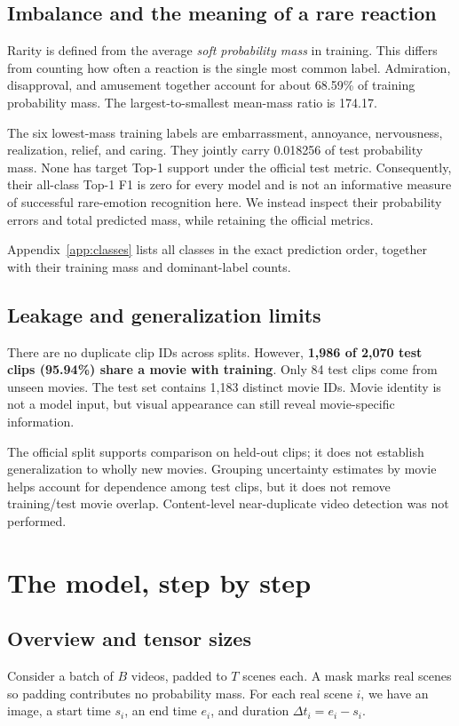 \documentclass[11pt,a4paper]{article}
\begin{document}
\subsection{Imbalance and the meaning of a rare reaction}
Rarity is defined from the average \emph{soft probability mass} in training. This differs from counting how often a reaction is the single most common label. Admiration, disapproval, and amusement together account for about 68.59\% of training probability mass. The largest-to-smallest mean-mass ratio is 174.17.

The six lowest-mass training labels are embarrassment, annoyance, nervousness, realization, relief, and caring. They jointly carry 0.018256 of test probability mass. None has target Top-1 support under the official test metric. Consequently, their all-class Top-1 F1 is zero for every model and is not an informative measure of successful rare-emotion recognition here. We instead inspect their probability errors and total predicted mass, while retaining the official metrics.

Appendix~\ref{app:classes} lists all classes in the exact prediction order, together with their training mass and dominant-label counts.

\subsection{Leakage and generalization limits}
There are no duplicate clip IDs across splits. However, \textbf{1,986 of 2,070 test clips (95.94\%) share a movie with training}. Only 84 test clips come from unseen movies. The test set contains 1,183 distinct movie IDs. Movie identity is not a model input, but visual appearance can still reveal movie-specific information.

The official split supports comparison on held-out clips; it does not establish generalization to wholly new movies. Grouping uncertainty estimates by movie helps account for dependence among test clips, but it does not remove training/test movie overlap. Content-level near-duplicate video detection was not performed.

\section{The model, step by step}\label{sec:model}
\subsection{Overview and tensor sizes}
Consider a batch of $B$ videos, padded to $T$ scenes each. A mask marks real scenes so padding contributes no probability mass. For each real scene $i$, we have an image, a start time $s_i$, an end time $e_i$, and duration $\Delta t_i=e_i-s_i$.
\end{document}
